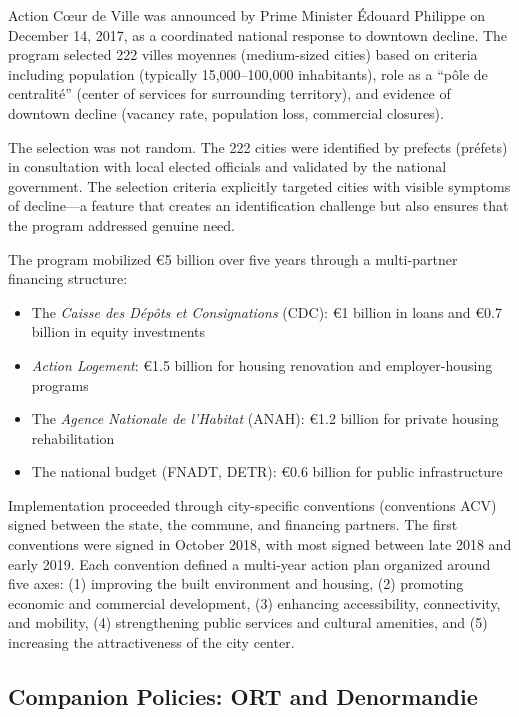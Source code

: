 \documentclass[12pt]{article}
\begin{document}
Action C\oe ur de Ville was announced by Prime Minister \'Edouard Philippe on December 14, 2017, as a coordinated national response to downtown decline. The program selected 222 villes moyennes (medium-sized cities) based on criteria including population (typically 15,000--100,000 inhabitants), role as a ``p\^ole de centralit\'e'' (center of services for surrounding territory), and evidence of downtown decline (vacancy rate, population loss, commercial closures).

The selection was not random. The 222 cities were identified by prefects (pr\'efets) in consultation with local elected officials and validated by the national government. The selection criteria explicitly targeted cities with visible symptoms of decline---a feature that creates an identification challenge but also ensures that the program addressed genuine need.

The program mobilized \euro 5 billion over five years through a multi-partner financing structure:
\begin{itemize}
    \item The \textit{Caisse des D\'ep\^ots et Consignations} (CDC): \euro 1 billion in loans and \euro 0.7 billion in equity investments
    \item \textit{Action Logement}: \euro 1.5 billion for housing renovation and employer-housing programs
    \item The \textit{Agence Nationale de l'Habitat} (ANAH): \euro 1.2 billion for private housing rehabilitation
    \item The national budget (FNADT, DETR): \euro 0.6 billion for public infrastructure
\end{itemize}

Implementation proceeded through city-specific conventions (conventions ACV) signed between the state, the commune, and financing partners. The first conventions were signed in October 2018, with most signed between late 2018 and early 2019. Each convention defined a multi-year action plan organized around five axes: (1) improving the built environment and housing, (2) promoting economic and commercial development, (3) enhancing accessibility, connectivity, and mobility, (4) strengthening public services and cultural amenities, and (5) increasing the attractiveness of the city center.

\subsection{Companion Policies: ORT and Denormandie}
\end{document}
